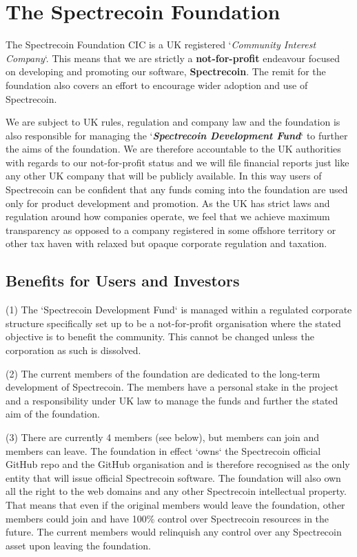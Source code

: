 \chapter{The Spectrecoin Foundation}
The Spectrecoin Foundation CIC is a UK registered ‘\textit{Community Interest Company}‘. 
This means that we are strictly a \textbf{not-for-profit} endeavour focused 
on developing and promoting our software, \textbf{Spectrecoin}. The remit 
for the foundation also covers an effort to encourage wider adoption and 
use of Spectrecoin.



We are subject to UK rules, regulation and company law and the foundation 
is also responsible for managing the ‘\textbf{\textit{Spectrecoin Development Fund}}‘ 
to further the aims of the foundation. We are therefore accountable to 
the UK authorities with regards to our not-for-profit status and we will 
file financial reports just like any other UK company that will be publicly 
available. In this way users of Spectrecoin can be confident that any funds 
coming into the foundation are used only for product development and 
promotion. As the UK has strict laws and regulation around how companies 
operate, we feel that we achieve maximum transparency as opposed to a company 
registered in some offshore territory or other tax haven with relaxed but 
opaque corporate regulation and taxation. 



\section{Benefits for Users and Investors}
(1) The ‘Spectrecoin Development Fund‘ is managed within a regulated corporate structure specifically set up to be a not-for-profit organisation where the stated objective is to benefit the community. This cannot be changed unless the corporation as such is dissolved. 

(2) The current members of the foundation are dedicated to the long-term development of Spectrecoin. The members have a personal stake in the project and a responsibility under UK law to manage the funds and further the stated aim of the foundation. 

(3) There are currently 4 members (see below), but members can join and members can leave. The foundation in effect ‘owns‘ the Spectrecoin official GitHub repo and the GitHub organisation and is therefore recognised as the only entity that will issue official Spectrecoin software. The foundation will also own all the right to the web domains and any other Spectrecoin intellectual property. That means that even if the original members would leave the foundation, other members could join and have 100\% control over Spectrecoin resources in the future. The current members would relinquish any control over any Spectrecoin asset upon leaving the foundation. 

